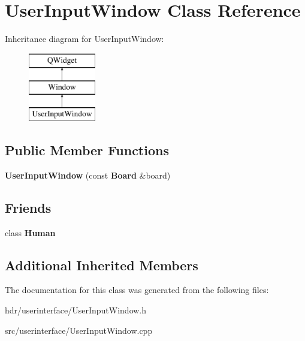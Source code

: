 \section{User\-Input\-Window Class Reference}
\label{class_user_input_window}
Inheritance diagram for User\-Input\-Window\-:\begin{figure}[H]
\begin{center}
\leavevmode
\includegraphics[height=3.000000cm]{class_user_input_window}
\end{center}
\end{figure}
\subsection*{Public Member Functions}
\begin{DoxyCompactItemize}
\item 
{\bfseries User\-Input\-Window} (const {\bf Board} \&board)\label{class_user_input_window_a41db4d0c44ac8c73af5745606c588c03}

\end{DoxyCompactItemize}
\subsection*{Friends}
\begin{DoxyCompactItemize}
\item 
class {\bfseries Human}\label{class_user_input_window_aa028043847be08771446e72e91baa53d}

\end{DoxyCompactItemize}
\subsection*{Additional Inherited Members}


The documentation for this class was generated from the following files\-:\begin{DoxyCompactItemize}
\item 
hdr/userinterface/User\-Input\-Window.\-h\item 
src/userinterface/User\-Input\-Window.\-cpp\end{DoxyCompactItemize}
